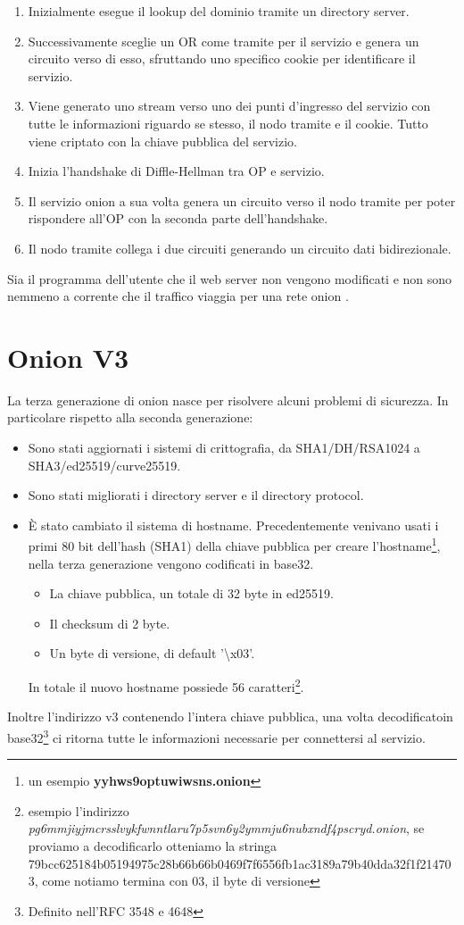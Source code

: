 \begin{enumerate}
    \item Inizialmente esegue il lookup del dominio tramite un directory server.
    \item Successivamente sceglie un OR come tramite per il servizio e genera un circuito verso di esso, sfruttando uno specifico cookie per identificare il servizio.
    \item Viene generato uno stream verso uno dei punti d'ingresso del servizio con tutte le informazioni riguardo se stesso, il nodo tramite e il cookie. Tutto viene criptato con la chiave pubblica del servizio.
    \item Inizia l'handshake di Diffle-Hellman tra OP e servizio.
    \item Il servizio onion a sua volta genera un circuito verso il nodo tramite per poter rispondere all'OP con la seconda parte dell'handshake.
    \item Il nodo tramite collega i due circuiti generando un circuito dati bidirezionale.
\end{enumerate}
Sia il programma dell'utente che il web server non vengono modificati e non sono nemmeno a corrente che il traffico viaggia per una rete onion \cite{ChaumMixes}.
\section{Onion V3}
La terza generazione di onion nasce per risolvere alcuni problemi di sicurezza. In particolare rispetto alla seconda generazione:
\begin{itemize}
    \item Sono stati aggiornati i sistemi di crittografia, da SHA1/DH/RSA1024 a SHA3/ed25519/curve25519.
    \item Sono stati migliorati i directory server e il directory protocol.
    \item È stato cambiato il sistema di hostname. Precedentemente venivano usati i primi 80 bit dell'hash (SHA1) della chiave pubblica per creare l'hostname\footnote{un esempio \textbf{yyhws9optuwiwsns.onion}}, nella terza generazione vengono codificati in base32.
    \begin{itemize}
        \item La chiave pubblica, un totale di 32 byte in ed25519.
        \item Il checksum di 2 byte.
        \item Un byte di versione, di default '\textbackslash x03'.
    \end{itemize}
    In totale il nuovo hostname possiede 56 caratteri\footnote{esempio l'indirizzo \emph{pg6mmjiyjmcrsslvykfwnntlaru7p5svn6y2ymmju6nubxndf4pscryd.onion}, se proviamo a decodificarlo otteniamo la stringa 79bcc625184b05194975c28b66b66b0469f7f6556fb1ac3189a79b40dda32f1f214703, come notiamo termina con 03, il byte di versione}.
\end{itemize}
Inoltre l'indirizzo v3 contenendo l'intera chiave pubblica, una volta decodificato\footnotemark[2] in base32\footnote{Definito nell'RFC 3548 e 4648} ci ritorna tutte le informazioni necessarie per connettersi al servizio. \\
\cite{Torv3}

